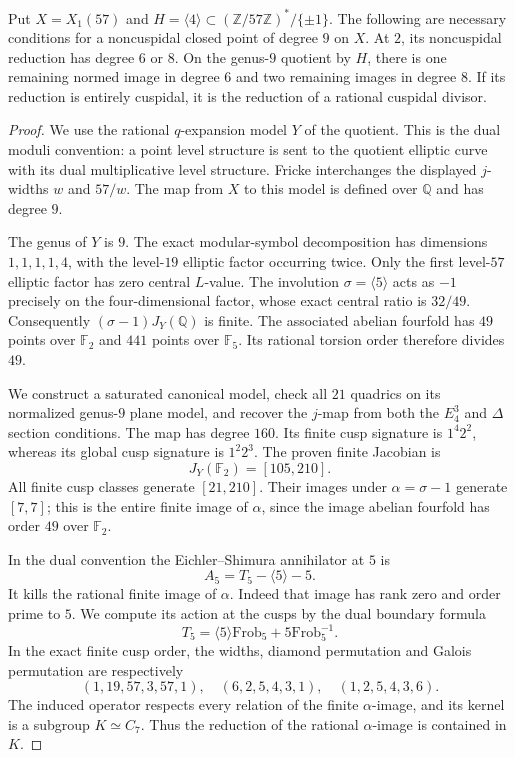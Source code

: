 \begin{proposition}\label{prop:nonic57-quotient9-partial}
Put $X=X_1(57)$ and $H=\langle4\rangle\subset
(\mathbb Z/57\mathbb Z)^*/\{\pm1\}$.
The following are necessary conditions for a noncuspidal closed
point of degree $9$ on $X$.
At $2$, its noncuspidal reduction has degree $6$ or $8$.
On the genus-$9$ quotient by $H$, there is one remaining normed
image in degree $6$ and two remaining images in degree $8$.
If its reduction is entirely cuspidal, it is the reduction of a
rational cuspidal divisor.
\end{proposition}
\begin{proof}
We use the rational $q$-expansion model $Y$ of the quotient.
This is the dual moduli convention: a point level structure
is sent to the quotient elliptic curve with its dual multiplicative
level structure. Fricke interchanges the displayed $j$-widths
$w$ and $57/w$. The map from $X$ to this model is defined over
$\mathbb Q$ and has degree $9$.

The genus of $Y$ is $9$. The exact modular-symbol decomposition
has dimensions $1,1,1,1,4$, with the level-$19$ elliptic factor
occurring twice. Only the first level-$57$ elliptic factor has
zero central $L$-value. The involution $\sigma=\langle5\rangle$
acts as $-1$ precisely on the four-dimensional factor, whose
exact central ratio is $32/49$.
Consequently $(\sigma-1)J_Y(\mathbb Q)$ is finite.
The associated abelian fourfold has $49$ points over $\mathbb F_2$
and $441$ points over $\mathbb F_5$. Its rational torsion order
therefore divides $49$.

We construct a saturated canonical model, check all $21$
quadrics on its normalized genus-$9$ plane model, and recover
the $j$-map from both the $E_4^3$ and $\Delta$ section conditions.
The map has degree $160$. Its finite cusp signature is
$1^4 2^2$, whereas its global cusp signature is $1^2 2^3$.
The proven finite Jacobian is
\[
 J_Y(\mathbb F_2)=[105,210].
\]
All finite cusp classes generate $[21,210]$.
Their images under $\alpha=\sigma-1$ generate $[7,7]$;
this is the entire finite image of $\alpha$, since the image
abelian fourfold has order $49$ over $\mathbb F_2$.

In the dual convention the Eichler--Shimura annihilator at $5$ is
\[
 A_5=T_5-\langle5\rangle-5.
\]
It kills the rational finite image of $\alpha$.
Indeed that image has rank zero and order prime to $5$.
We compute its action at the cusps by the dual boundary formula
\[
 T_5=\langle5\rangle\mathrm{Frob}_5+
 5\mathrm{Frob}_5^{-1}.
\]
In the exact finite cusp order, the widths, diamond permutation
and Galois permutation are respectively
\[
 (1,19,57,3,57,1),\quad
 (6,2,5,4,3,1),\quad(1,2,5,4,3,6).
\]
The induced operator respects every relation of the finite
$\alpha$-image, and its kernel is a subgroup $K\simeq C_7$.
Thus the reduction of the rational $\alpha$-image is contained
in $K$.


\end{proof}
